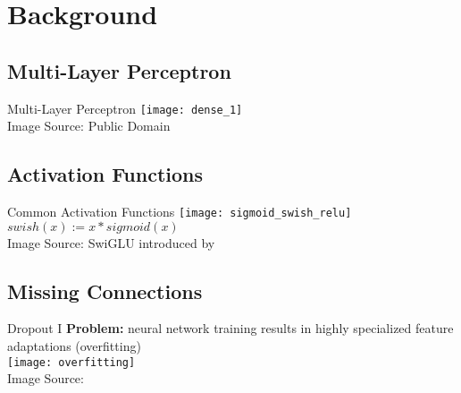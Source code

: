 \section{Background}
\subsection{Multi-Layer Perceptron}
\begin{frame}[c]{Multi-Layer Perceptron}
    \texttt{[image: dense\_1]} \\
    \normalsize
    Image Source: Public Domain
\end{frame}

\subsection{Activation Functions}
\begin{frame}[c]{Common Activation Functions}
    \texttt{[image: sigmoid\_swish\_relu]} \\
    $swish(x) := x * sigmoid(x)$ \\
    Image Source: \cite{chen_deep_2021} \hspace{1cm}
    SwiGLU introduced by \cite{shazeer_glu_2020}
\end{frame}

\subsection{Missing Connections}
\begin{frame}[c]{Dropout I}
    \large
    \textbf{Problem:} neural network training results in highly specialized feature adaptations (overfitting) \\
    \texttt{[image: overfitting]} \\
    \normalsize
    Image Source: \cite{lever_points_2016}
\end{frame}

